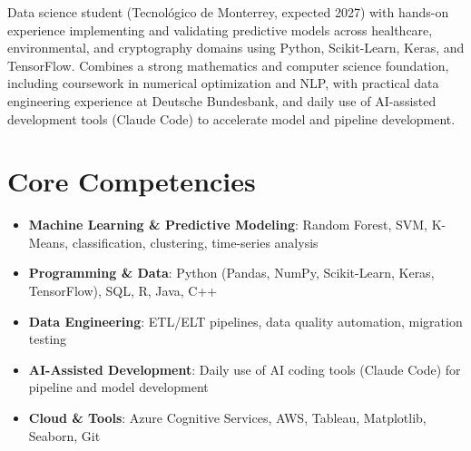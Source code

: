 \documentclass[11pt,a4paper,sans]{moderncv}
\begin{document}
\makecvtitle


\vspace{6pt}
\small{Data science student (Tecnológico de Monterrey, expected 2027) with hands-on experience implementing and validating predictive models across healthcare, environmental, and cryptography domains using Python, Scikit-Learn, Keras, and TensorFlow. Combines a strong mathematics and computer science foundation, including coursework in numerical optimization and NLP, with practical data engineering experience at Deutsche Bundesbank, and daily use of AI-assisted development tools (Claude Code) to accelerate model and pipeline development.}


\section{Core Competencies}
\vspace{1pt}
\begin{itemize}

\item \textbf{Machine Learning \& Predictive Modeling}: Random Forest, SVM, K-Means, classification, clustering, time-series analysis

\item \textbf{Programming \& Data}: Python (Pandas, NumPy, Scikit-Learn, Keras, TensorFlow), SQL, R, Java, C++

\item \textbf{Data Engineering}: ETL/ELT pipelines, data quality automation, migration testing

\item \textbf{AI-Assisted Development}: Daily use of AI coding tools (Claude Code) for pipeline and model development

\item \textbf{Cloud \& Tools}: Azure Cognitive Services, AWS, Tableau, Matplotlib, Seaborn, Git

\end{itemize}

\end{document}
